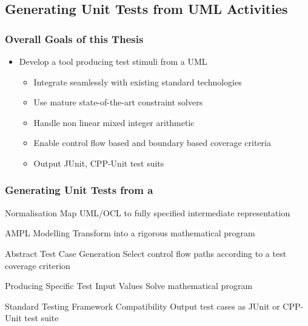\documentclass{beamer}
\begin{document}
\subsection{Generating Unit Tests from UML Activities}
\begin{frame}
\frametitle{Overall Goals of this Thesis}
\begin{itemize}
\item Develop a tool producing test stimuli from a UML 
\begin{itemize}
\item Integrate seamlessly with existing standard technologies
\item Use mature state-of-the-art constraint solvers
\item Handle non linear mixed integer arithmetic
\item Enable control flow based and boundary based coverage criteria
\item Output JUnit, CPP-Unit test suits
\end{itemize}
\end{itemize}
\end{frame}

\begin{frame}
\frametitle{Generating Unit Tests from a }
\begin{block}{Normalisation}
Map UML/OCL to fully specified intermediate representation
\end{block}
\begin{block}{AMPL Modelling}
Transform into a rigorous mathematical program
\end{block}
\begin{block}{Abstract Test Case Generation}
Select control flow paths according to a test coverage criterion 
\end{block}
\begin{block}{Producing Specific Test Input Values}
Solve mathematical program
\end{block}
\begin{block}{Standard Testing Framework Compatibility}
Output test cases as JUnit or CPP-Unit test suite
\end{block}
\end{frame}
\end{document}
